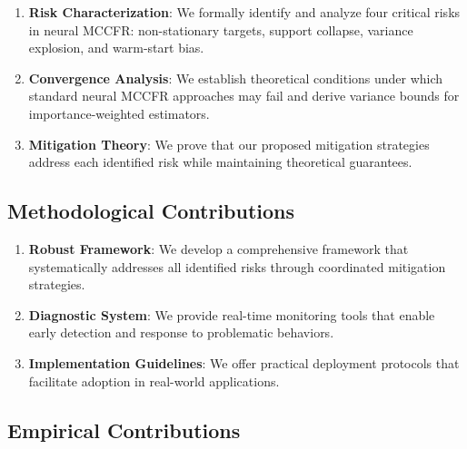 \documentclass[12pt,a4paper]{article}
\begin{document}
\begin{enumerate}
\item \textbf{Risk Characterization}: We formally identify and analyze four critical risks in neural MCCFR: non-stationary targets, support collapse, variance explosion, and warm-start bias.

\item \textbf{Convergence Analysis}: We establish theoretical conditions under which standard neural MCCFR approaches may fail and derive variance bounds for importance-weighted estimators.

\item \textbf{Mitigation Theory}: We prove that our proposed mitigation strategies address each identified risk while maintaining theoretical guarantees.
\end{enumerate}

\subsection{Methodological Contributions}

\begin{enumerate}
\item \textbf{Robust Framework}: We develop a comprehensive framework that systematically addresses all identified risks through coordinated mitigation strategies.

\item \textbf{Diagnostic System}: We provide real-time monitoring tools that enable early detection and response to problematic behaviors.

\item \textbf{Implementation Guidelines}: We offer practical deployment protocols that facilitate adoption in real-world applications.
\end{enumerate}

\subsection{Empirical Contributions}
\end{document}
